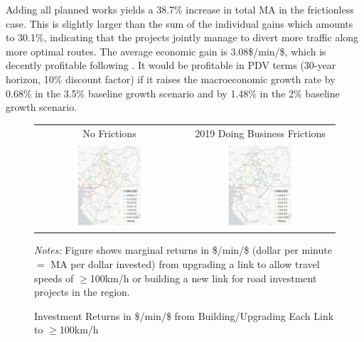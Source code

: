 \documentclass[a4paper]{article}
\begin{document}
Adding all planned works yields a 38.7\% increase in total MA in the frictionless case. This is slightly larger than the sum of the individual gains which amounts to 30.1\%, indicating that the projects jointly manage to divert more traffic along more optimal routes. The average economic gain is 3.08\$/min/\$, which is decently profitable following \citet{donaldson2016railroads}. It would be profitable in PDV terms (30-year horizon, 10\% discount factor) if it raises the macroeconomic growth rate by 0.68\% in the 3.5\% baseline growth scenario and by 1.48\% in the 2\% baseline growth scenario.

\begin{figure}[H]  \vspace{-1mm}
\centering
\caption{\label{fig:MA_TT_PUSD} Investment Returns in \$/min/\$ from Building/Upgrading Each Link to $\geq$100km/h}
\vspace{2mm}
\begin{tabular}{cc}
No Frictions & 2019 Doing Business Frictions \\
\includegraphics[width=0.48\textwidth]{"../figures/PE/trans_CEMAC_network_MA_gain_all_100kmh_pusd_planned_projects.pdf"} &
\includegraphics[width=0.48\textwidth]{"../figures/PE/trans_CEMAC_network_MA_gain_all_100kmh_pusd_bt_planned_projects.pdf"}  \\ [-0.2em]
\end{tabular}
\raggedright
\scriptsize 
\emph{Notes:} Figure shows marginal returns in \$/min/\$ (dollar per minute $=$ MA per dollar invested) from upgrading a link to allow travel speeds of $\geq$100km/h or building a new link for road investment projects in the region.
\end{figure}
\end{document}
